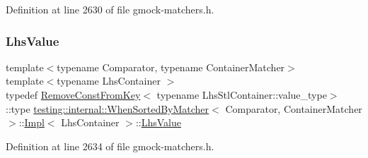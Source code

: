 Definition at line 2630 of file gmock-\/matchers.\+h.

\mbox{\label{classtesting_1_1internal_1_1WhenSortedByMatcher_1_1Impl_a93044f4ba53373fcfc424132b5e6c462}} 
\subsubsection{\texorpdfstring{Lhs\+Value}{LhsValue}}
{\footnotesize\ttfamily template$<$typename Comparator, typename Container\+Matcher$>$ \\
template$<$typename Lhs\+Container $>$ \\
typedef \hyperlink{structtesting_1_1internal_1_1RemoveConstFromKey}{Remove\+Const\+From\+Key}$<$ typename Lhs\+Stl\+Container\+::value\+\_\+type$>$\+::type \hyperlink{classtesting_1_1internal_1_1WhenSortedByMatcher}{testing\+::internal\+::\+When\+Sorted\+By\+Matcher}$<$ Comparator, Container\+Matcher $>$\+::\hyperlink{classtesting_1_1internal_1_1WhenSortedByMatcher_1_1Impl}{Impl}$<$ Lhs\+Container $>$\+::\hyperlink{classtesting_1_1internal_1_1WhenSortedByMatcher_1_1Impl_a93044f4ba53373fcfc424132b5e6c462}{Lhs\+Value}}



Definition at line 2634 of file gmock-\/matchers.\+h.

\mbox{\label{classtesting_1_1internal_1_1WhenSortedByMatcher_1_1Impl_a4c84fddfe1bf967a73e5dae1940db427}} 
